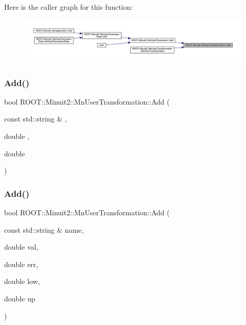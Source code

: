 Here is the caller graph for this function\+:\nopagebreak
\begin{figure}[H]
\begin{center}
\leavevmode
\includegraphics[width=350pt]{d9/d98/classROOT_1_1Minuit2_1_1MnUserTransformation_a2ddcd7b0cc5234b386407d7a76db1720_icgraph}
\end{center}
\end{figure}
\mbox{\label{classROOT_1_1Minuit2_1_1MnUserTransformation_a2ddcd7b0cc5234b386407d7a76db1720}} 
\subsubsection{\texorpdfstring{Add()}{Add()}\hspace{0.1cm}{\footnotesize\ttfamily [2/6]}}
{\footnotesize\ttfamily bool R\+O\+O\+T\+::\+Minuit2\+::\+Mn\+User\+Transformation\+::\+Add (\begin{DoxyParamCaption}\item[{const std\+::string \&}]{,  }\item[{double}]{,  }\item[{double}]{ }\end{DoxyParamCaption})}

\mbox{\label{classROOT_1_1Minuit2_1_1MnUserTransformation_a173dea97b7be768e54b669c53b92c2dc}} 
\subsubsection{\texorpdfstring{Add()}{Add()}\hspace{0.1cm}{\footnotesize\ttfamily [3/6]}}
{\footnotesize\ttfamily bool R\+O\+O\+T\+::\+Minuit2\+::\+Mn\+User\+Transformation\+::\+Add (\begin{DoxyParamCaption}\item[{const std\+::string \&}]{name,  }\item[{double}]{val,  }\item[{double}]{err,  }\item[{double}]{low,  }\item[{double}]{up }\end{DoxyParamCaption})}

